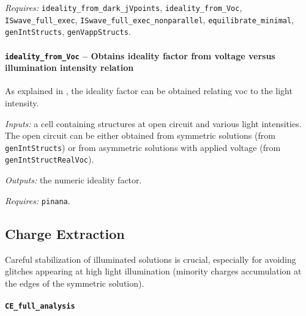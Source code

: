 \textit{Requires:} \texttt{ideality_from_dark_jVpoints}, \texttt{ideality_from_Voc}, \texttt{ISwave_full_exec}, \texttt{ISwave_full_exec_nonparallel}, \texttt{equilibrate_minimal}, \texttt{genIntStructs}, \texttt{genVappStructs}.

			\paragraph{\texttt{ideality_from_Voc} -- Obtains ideality factor from voltage versus illumination intensity relation}\label{dd_ideality}
	As explained in , the ideality factor can be obtained relating \gls{voc} to the light intensity.
	
			\textit{Inputs:} a cell containing structures at open circuit and various
	     light intensities. The open circuit can be either obtained from
	     symmetric solutions (from \texttt{genIntStructs}) or from asymmetric solutions
	     with applied voltage (from \texttt{genIntStructRealVoc}).
	
	\textit{Outputs:} the numeric ideality factor.
	
	\textit{Requires:} \texttt{pinana}.
	
	

	\subsection{Charge Extraction}
		Careful stabilization of illuminated solutions is crucial, especially for avoiding glitches appearing at high light illumination (minority charges accumulation at the edges of the symmetric solution).
		\paragraph{\texttt{CE_full_analysis}}
